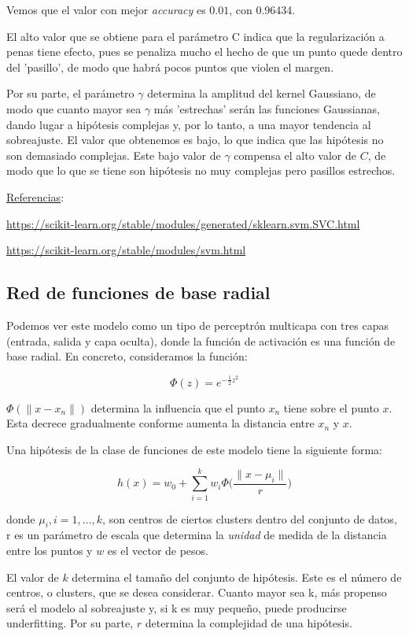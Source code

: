 \documentclass[a4]{article}
\begin{document}
Vemos que el valor con mejor \textit{accuracy} es $0.01$, con 0.96434.

El alto valor que se obtiene para el parámetro C indica que la regularización a penas tiene efecto, pues se penaliza mucho el hecho de que un punto quede dentro del 'pasillo', de modo que habrá pocos puntos que violen el margen. 

Por su parte, el parámetro $\gamma$ determina la amplitud del kernel Gaussiano, de modo que cuanto mayor sea $\gamma$ más 'estrechas' serán las funciones Gaussianas, dando lugar a hipótesis complejas y, por lo tanto, a una mayor tendencia al sobreajuste. El valor que obtenemos es bajo, lo que indica que las hipótesis no son demasiado complejas. Este bajo valor de $\gamma$ compensa el alto valor de $C$, de modo que lo que se tiene son hipótesis no muy complejas pero pasillos estrechos.  

\underline{Referencias}:

\href{https://scikit-learn.org/stable/modules/generated/sklearn.svm.SVC.html}{https://scikit-learn.org/stable/modules/generated/sklearn.svm.SVC.html}

\href{https://scikit-learn.org/stable/modules/svm.html}{https://scikit-learn.org/stable/modules/svm.html}

\subsection{Red de funciones de base radial}

Podemos ver este modelo como un tipo de perceptrón multicapa con tres capas (entrada, salida y capa oculta), donde la función de activación es una función de base radial. En concreto, consideramos la función: 

$$\Phi(z)=e^{-\frac{1}{2}z^2}$$

$\Phi(\|x-x_n\|)$ determina la influencia que el punto $x_n$ tiene sobre el punto $x$. Esta decrece gradualmente conforme aumenta la distancia entre  $x_n$ y $x$. 

Una hipótesis de la clase de funciones de este modelo tiene la siguiente forma:

$$ h(x)=w_0 + \sum_{i=1}^k w_i\Phi\Big( \frac{\|x-\mu_i\|}{r}\Big) $$

donde $\mu_i, i=1,...,k$, son centros de ciertos clusters dentro del conjunto de datos, r es un parámetro de escala que determina la \textit{unidad} de medida de la distancia entre los puntos y $w$ es el vector de pesos. 

El valor de $k$ determina el tamaño del conjunto de hipótesis. Este es el número de centros, o clusters, que se desea considerar. Cuanto mayor sea k, más propenso será el modelo al sobreajuste y, si k es muy pequeño, puede producirse underfitting. Por su parte, $r$ determina la complejidad de una hipótesis. 
\end{document}

